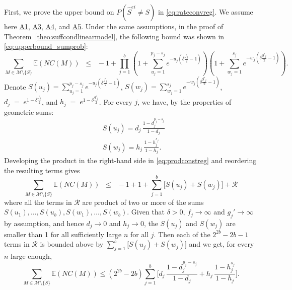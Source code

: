 \documentclass[
  12pt]{article}
\newcommand{\piotr}[1]{{\small{\color{red} \sf $\clubsuit$ Piotr: #1}}}
\newcommand{\E}{\mathbb{E}}
\newcommand{\M}{\mathcal{M}}
\begin{document}
First, we prove the upper bound on $P(\hat{S}^{ei} \neq S)$ in \eqref{eq:rateconvreg}. We assume here \hyperlink{lab:A1}{A1}, \hyperlink{lab:A3}{A3}, \hyperlink{lab:A4}{A4}, and \hyperlink{lab:A5}{A5}. Under the same assumptions, in the proof of Theorem~\ref{theo:suffcondlinearmodel}, the following bound was shown in \eqref{eq:upperbound_sumprob}:
\begin{equation}\label{eq:prodconstreg}
 \sum_{M \in \M\setminus \{S\}} \E\left(NC(M)\right)
    \;\;\leq\;\; - 1+\prod_{j=1}^b\left(1+\sum_{u_j=1}^{p_j-s_j}e^{-u_j\left(\delta \tfrac{f_j}{2}-1\right)}\right)\left(1+
    \sum_{w_j=1}^{s_j}    e^{-w_j\left(\delta \tfrac{g'_j}{2}-1\right)}\right) .
\end{equation}
Denote $S(u_j)=\sum_{u_j=1}^{p_j-s_j}e^{-u_j\left(\delta \tfrac{f_j}{2}-1\right)}$,  $S(w_j)=\sum_{w_j=1}^{s_j}    e^{-w_j\left(\delta \tfrac{g'_j}{2}-1\right)}$, $d_j\;=\;e^{1-\delta \tfrac{f_j}{2}}$, and $h_j\;=\;e^{1-\delta \tfrac{g'_j}{2}}$. For every $j$, we have, by the properties of geometric sums:
\begin{align*}
    &S(u_j)
    =d_j\,\frac{1-d_j^{p_j-s_j}}{1-d_j} \\
    &S(w_j) =h_j\,\frac{1-h_j^{s_j}}{1-h_j}.
\end{align*}
Developing the product in the right-hand side in \eqref{eq:prodconstreg} and reordering the resulting terms gives
$$\sum_{M \in \M\setminus \{S\}} \E\left(NC(M)\right)\;\;\leq\;\;-1+1+\sum_{j=1}^b\big[S(u_j)+S(w_j)\big]+\mathcal{R}$$
where all the terms in $\mathcal{R}$ are product of two or more of the sums $S(u_1),\ldots,S(u_b),S(w_1),\ldots,S(w_b)$. Given that $\delta>0$, $f_j \to \infty$ and $g_j' \to \infty$ by assumption, and hence $d_j \to 0$ and $h_j \to 0$, the $S(u_j)$ and $S(w_j)$ are smaller than 1 for all sufficiently large $n$ for all $j$. Then each of the $2^{2b}-2b-1$ terms in $\mathcal{R}$ is bounded above by $\sum_{j=1}^b\big[S(u_j)+S(w_j)\big]$ and we get, for every $n$ large enough,
 \begin{equation} \label{eq:fierg}
 \sum_{M \in \M\setminus \{S\}} \E\left(NC(M)\right)
 \leq (2^{2b}-2b)\sum_{j=1}^b \bigg[d_j\,\frac{1-d_j^{p_j-s_j}}{1-d_j}+ h_j\,\frac{1-h_j^{s_j}}{1-h_j}\bigg ]. \end{equation} 
\end{document}
